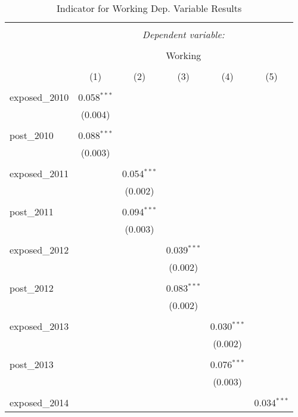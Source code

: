 
\begin{table}[!htbp] \centering 
  \caption{Indicator for Working Dep. Variable Results} 
  \label{} 
\begin{tabular}{@{\extracolsep{5pt}}lccccc} 
\\[-1.8ex]\hline 
\hline \\[-1.8ex] 
 & \multicolumn{5}{c}{\textit{Dependent variable:}} \\ 
\cline{2-6} 
\\[-1.8ex] & \multicolumn{5}{c}{Working} \\ 
\\[-1.8ex] & (1) & (2) & (3) & (4) & (5)\\ 
\hline \\[-1.8ex] 
 exposed\_2010 & 0.058$^{***}$ &  &  &  &  \\ 
  & (0.004) &  &  &  &  \\ 
  & & & & & \\ 
 post\_2010 & 0.088$^{***}$ &  &  &  &  \\ 
  & (0.003) &  &  &  &  \\ 
  & & & & & \\ 
 exposed\_2011 &  & 0.054$^{***}$ &  &  &  \\ 
  &  & (0.002) &  &  &  \\ 
  & & & & & \\ 
 post\_2011 &  & 0.094$^{***}$ &  &  &  \\ 
  &  & (0.003) &  &  &  \\ 
  & & & & & \\ 
 exposed\_2012 &  &  & 0.039$^{***}$ &  &  \\ 
  &  &  & (0.002) &  &  \\ 
  & & & & & \\ 
 post\_2012 &  &  & 0.083$^{***}$ &  &  \\ 
  &  &  & (0.002) &  &  \\ 
  & & & & & \\ 
 exposed\_2013 &  &  &  & 0.030$^{***}$ &  \\ 
  &  &  &  & (0.002) &  \\ 
  & & & & & \\ 
 post\_2013 &  &  &  & 0.076$^{***}$ &  \\ 
  &  &  &  & (0.003) &  \\ 
  & & & & & \\ 
 exposed\_2014 &  &  &  &  & 0.034$^{***}$ \\ 

\end{tabular}
\end{table}
